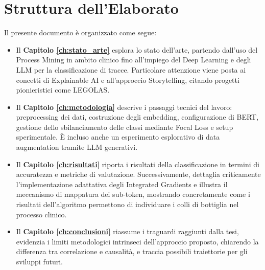 \section{Struttura dell'Elaborato}
Il presente documento è organizzato come segue:
\begin{itemize}
    \item Il \textbf{Capitolo \ref{ch:stato_arte}} esplora lo stato dell'arte, partendo dall'uso del Process Mining in ambito clinico fino all'impiego del Deep Learning e degli LLM per la classificazione di tracce. Particolare attenzione viene posta ai concetti di Explainable AI e all'approccio Storytelling, citando progetti pionieristici come LEGOLAS.
    \item Il \textbf{Capitolo \ref{ch:metodologia}} descrive i passaggi tecnici del lavoro: preprocessing dei dati, costruzione degli embedding, configurazione di BERT, gestione dello sbilanciamento delle classi mediante Focal Loss e setup sperimentale. È incluso anche un esperimento esplorativo di data augmentation tramite LLM generativi.
    \item Il \textbf{Capitolo \ref{ch:risultati}} riporta i risultati della classificazione in termini di accuratezza e metriche di valutazione. Successivamente, dettaglia criticamente l'implementazione adattativa degli Integrated Gradients e illustra il meccanismo di mappatura dei sub-token, mostrando concretamente come i risultati dell'algoritmo permettono di individuare i colli di bottiglia nel processo clinico.
    \item Il \textbf{Capitolo \ref{ch:conclusioni}} riassume i traguardi raggiunti dalla tesi, evidenzia i limiti metodologici intrinseci dell'approccio proposto, chiarendo la differenza tra correlazione e causalità, e traccia possibili traiettorie per gli sviluppi futuri.
\end{itemize}
